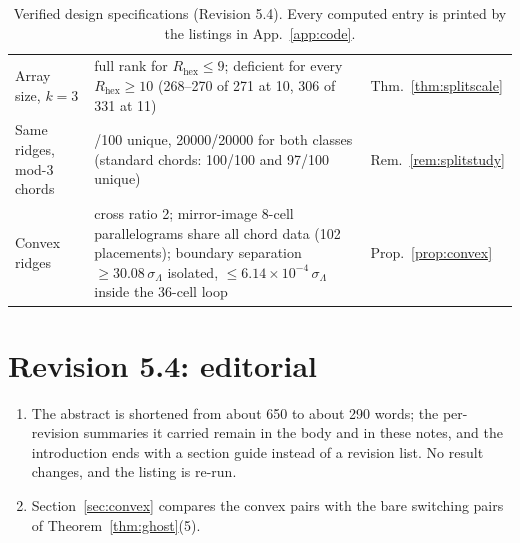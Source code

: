 \documentclass[11pt,a4paper]{article}
\theoremstyle{definition}
\theoremstyle{remark}
\begin{document}
\begin{table}[!p]
\begin{tabularx}{\textwidth}{@{}>{\raggedright\arraybackslash}p{3.6cm}>{\raggedright\arraybackslash}X>{\raggedright\arraybackslash}p{2.6cm}@{}}
Array size, $k=3$ & full rank for $R_{\text{hex}}\le9$; deficient for every $R_{\text{hex}}\ge10$ (268--270 of 271 at 10, 306 of 331 at 11) & Thm.~\ref{thm:splitscale} \\
Same ridges, mod-3 chords & 100/100 unique, 20000/20000 for both classes (standard chords: 100/100 and 97/100 unique) & Rem.~\ref{rem:splitstudy} \\
Convex ridges & cross ratio 2; mirror-image 8-cell parallelograms share all chord data (102 placements); boundary separation $\ge30.08\,\sigma_\Lambda$ isolated, $\le6.14\times10^{-4}\,\sigma_\Lambda$ inside the 36-cell loop & Prop.~\ref{prop:convex} \\
\bottomrule
\end{tabularx}
\caption{Verified design specifications (Revision 5.4). Every computed entry is printed by the listings in App.~\ref{app:code}.}\label{tab:specs}
\end{table}

\section*{Revision 5.4: editorial}
\begin{enumerate}[noitemsep,leftmargin=*]
\item The abstract is shortened from about 650 to about 290 words; the per-revision summaries it carried remain in the body and in these notes, and the introduction ends with a section guide instead of a revision list. No result changes, and the listing is re-run.
\item Section~\ref{sec:convex} compares the convex pairs with the bare switching pairs of Theorem~\ref{thm:ghost}(5).
\end{enumerate}
\end{document}
